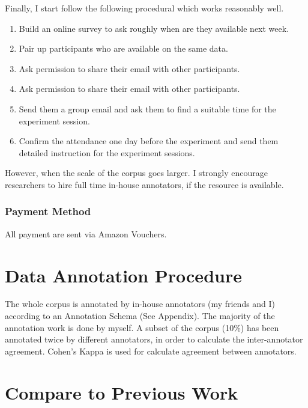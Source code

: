 \documentclass[bsc,frontabs,twoside,singlespacing,parskip,deptreport]{infthesis}     %
\begin{document}
Finally, I start follow the following procedural which works reasonably well. 

\begin{enumerate}
   \item Build an online survey to ask roughly when are they available next week.

   \item Pair up participants who are available on the same data.
 
   \item Ask permission to share their email with other participants.
   
    \item Ask permission to share their email with other participants.

    \item Send them a group email and ask them to find a suitable time for the experiment session.

    \item Confirm the attendance one day before the experiment and send them detailed instruction for the experiment sessions.
    
\end{enumerate}

However, when the scale of the corpus goes larger. I strongly encourage researchers to hire full time in-house annotators, if the resource is available.

\subsubsection*{Payment Method}

All payment are sent via Amazon Vouchers.


\section{Data Annotation Procedure}

The whole corpus is annotated by in-house annotators (my friends and I) according to an Annotation Schema (See Appendix). The majority of the annotation work is done by myself. A subset of the corpus (10\%) has been annotated twice by different annotators, in order to calculate the inter-annotator agreement. Cohen's Kappa is used for calculate agreement between annotators.

\section{Compare to Previous Work}
\end{document}
